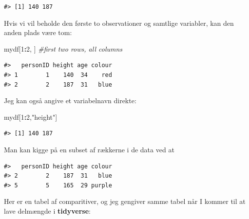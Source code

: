 \documentclass[
]{book}
\newenvironment{Shaded}{\begin{snugshade}}{\end{snugshade}}
\newcommand{\CommentTok}[1]{\textcolor[rgb]{0.37,0.37,0.37}{\textit{#1}}}
\newcommand{\DecValTok}[1]{\textcolor[rgb]{0.06,0.06,0.06}{#1}}
\newcommand{\NormalTok}[1]{#1}
\newcommand{\SpecialCharTok}[1]{\textcolor[rgb]{0.43,0.43,0.43}{\textbf{#1}}}
\newcommand{\StringTok}[1]{\textcolor[rgb]{0.5,0.5,0.5}{#1}}
\begin{document}
\begin{verbatim}
#> [1] 140 187
\end{verbatim}

Hvis vi vil beholde den første to observationer og samtlige variabler, kan den anden plads være tom:

\begin{Shaded}
\begin{Highlighting}[]
\NormalTok{mydf[}\DecValTok{1}\SpecialCharTok{:}\DecValTok{2}\NormalTok{, ]  }\CommentTok{\#first two rows, all columns}
\end{Highlighting}
\end{Shaded}

\begin{verbatim}
#>   personID height age colour
#> 1        1    140  34    red
#> 2        2    187  31   blue
\end{verbatim}

Jeg kan også angive et variabelnavn direkte:

\begin{Shaded}
\begin{Highlighting}[]
\NormalTok{mydf[}\DecValTok{1}\SpecialCharTok{:}\DecValTok{2}\NormalTok{,}\StringTok{"height"}\NormalTok{]}
\end{Highlighting}
\end{Shaded}

\begin{verbatim}
#> [1] 140 187
\end{verbatim}

Man kan kigge på en subset af rækkerne i de data ved at

\begin{Shaded}
\end{Shaded}

\begin{verbatim}
#>   personID height age colour
#> 2        2    187  31   blue
#> 5        5    165  29 purple
\end{verbatim}

Her er en tabel af comparitiver, og jeg gengiver samme tabel når I kommer til at lave delmængde i \textbf{tidyverse}:
\end{document}
